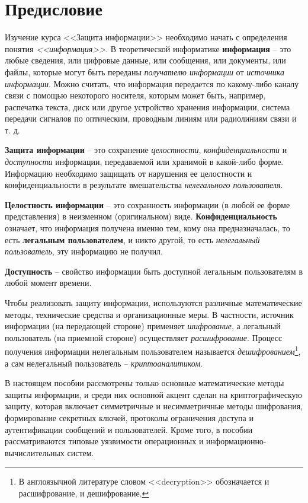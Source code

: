 \chapter*{Предисловие}

Изучение курса <<Защита информации>> необходимо начать с определения понятия \emph{<<информация>>}. В теоретической информатике \textbf{информация} -- это любые сведения, или цифровые данные, или сообщения, или документы, или файлы, которые могут быть переданы \emph{получателю информации} от \emph{источника информации}. Можно считать, что информация передается по какому-либо каналу связи с помощью некоторого носителя, которым может быть, например, распечатка текста, диск или другое устройство хранения информации, система передачи сигналов по оптическим, проводным линиям или радиолиниям связи и т. д.

\textbf{Защита информации} -- это сохранение \emph{целостности}, \emph{конфиденциальности} и \emph{доступности} информации, передаваемой или хранимой в какой-либо форме. Информацию необходимо защищать от нарушения ее целостности и конфиденциальности в результате вмешательства \emph{нелегального пользователя}.

\textbf{Целостность информации} -- это сохранность информации (в любой ее форме представления) в неизменном (оригинальном) виде. \textbf{Конфиденциальность} означает, что информация получена именно тем, кому она предназначалась, то есть \textbf{легальным пользователем}, и никто другой, то есть \emph{нелегальный пользователь}, эту информацию не получил.

\textbf{Доступность} -- свойство информации быть доступной легальным пользователям в любой момент времени.

Чтобы реализовать защиту информации, используются различные математические методы, технические средства и организационные меры. В частности, источник информации (на передающей стороне) применяет \emph{шифрование}, а легальный пользователь (на приемной стороне) осуществляет \emph{расшифрование}. Процесс получения информации нелегальным пользователем называется \emph{дешифрованием}\footnote{В англоязычной литературе словом <<decryption>> обозначается и расшифрование, и дешифрование.}, а сам нелегальный пользователь -- \emph{криптоаналитиком}.

В настоящем пособии рассмотрены только основные математические методы защиты информации, и среди них основной акцент сделан на криптографическую защиту, которая включает симметричные и несимметричные методы шифрования, формирование секретных ключей, протоколы ограничения доступа и аутентификации сообщений и пользователей. Кроме того, в пособии рассматриваются типовые уязвимости операционных и информационно-вычислительных систем.

